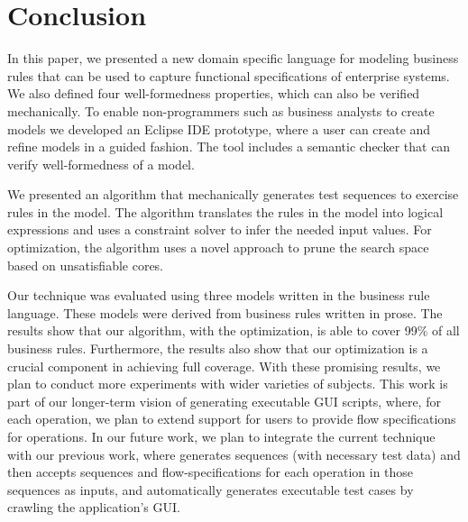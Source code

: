 \section{Conclusion}

In this paper, we presented a new domain specific language for
modeling business rules that can be used to capture functional
specifications of enterprise systems. We also defined four well-formedness properties,
which can also be verified mechanically. To enable non-programmers 
such as business analysts to create models we
developed an Eclipse IDE prototype, where a user can create and refine
models in a guided fashion. The tool includes a semantic checker that
can verify well-formedness of a model.

We presented an algorithm that mechanically generates test sequences to
exercise rules in the model. The algorithm translates the rules in the
model into logical expressions and uses a constraint solver to infer
the needed input values. For optimization, the algorithm uses a novel
approach to prune the search space based on unsatisfiable cores. 

Our technique was evaluated using three models written in the
business rule language. These models were derived from business rules
written in prose. The results show that our algorithm, with the
optimization, is able to cover 99\% of all business rules. Furthermore,
the results also show that our optimization is a crucial component in
achieving full coverage. With these promising results, we plan to
conduct more experiments with wider varieties of subjects. This work
is part of our longer-term vision of generating executable GUI scripts,
where, for each operation, we plan to extend support for users to provide flow specifications 
for operations. In our future work, we plan to integrate the
current technique with our previous work, where \tool{} generates sequences (with
necessary test data) and then \wateg{} accepts sequences and flow-specifications 
for each operation in those sequences as inputs, and automatically
generates executable test cases by crawling the application's GUI.